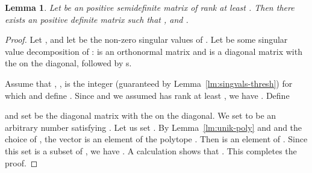 \documentclass{article}
\newtheorem{lemma}{Lemma}[theorem]
\begin{document}
\begin{lemma}\label{lm:subgr-soln}
  Let  be an  positive semidefinite matrix of rank at
  least . Then there exists an  positive definite matrix
   such that , and . 
\end{lemma}
\begin{proof}
  Let , and let  be
  the non-zero singular values of . Let  be
  some singular value decomposition of :  is an orthonormal
  matrix and  is a diagonal matrix with the  on the
  diagonal, followed by s.

  Assume that , , is the integer (guaranteed by
  Lemma~\ref{lm:singvals-thresh}) for which  and define . Since  and
 we assumed  has rank at least , we have .  Define
  
  and set  be the diagonal matrix with the  on the diagonal.
  We set  to be an arbitrary number satisfying . Let us set . By
  Lemma~\ref{lm:unik-poly} and and the choice of , the vector
   is an element of the polytope
  . Then  is an element of . Since this set is a subset of , we
  have . A calculation shows that
  . This completes
  the proof. 
\end{proof}
\end{document}
